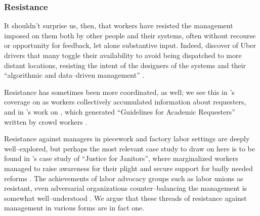 \documentclass[trackingWork]{subfiles}
\begin{document}
{    \subsubsection{Resistance}
    It shouldn't surprise us, then, that workers have resisted the management imposed on them both by other people and their systems,      often without recourse or opportunity for feedback, let alone substantive input.
    Indeed, \citeauthor{uberAlgorithm} discover of Uber drivers that 
    many toggle their availability to avoid being dispatched to more distant locations,      resisting the intent of the designers of the systems and their ``algorithmic and data--driven management''
    \cite{uberAlgorithm}.

    Resistance has sometimes been more coordinated, as well;
    we see this in \citeauthor{turkopticon}'s coverage on \TO
    as workers collectively accumulated information about requesters, and
    in \citeauthor{dynamo}'s work on \DO, which generated ``Guidelines for Academic Requesters'' written by crowd workers
    \cite{turkopticon,dynamo}.

    Resistance against managers in piecework and factory labor settings are deeply well--explored,      but perhaps the most relevant case study to draw on here is to be found in
    \citeauthor{waldinger1996helots}'s case study of ``Justice for Janitors'',      where marginalized workers managed to raise awareness for their plight and secure support for badly needed reforms
    \cite{waldinger1996helots}.
    The achievements of labor advocacy groups such as labor unions as resistant,      even adversarial organizations counter--balancing the management
    is somewhat well--understood
    \cite{russell1982collective,craig1992behavior}.
    We argue that these threads of resistance against management in various forms
    are in fact one.
  }
\end{document}
